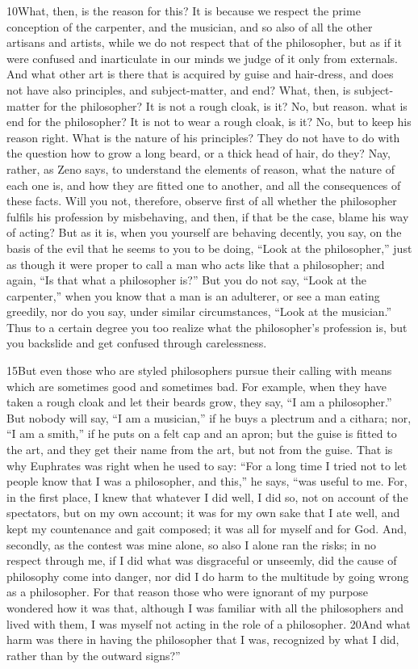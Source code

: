 10What, then, is the reason for this? It is because we respect the prime conception of the carpenter, and the musician, and so also of all the other artisans and artists, while we do not respect that of the philosopher, but as if it were confused and inarticulate in our minds we judge of it only from externals. And what other art is there that is acquired by guise and hair-dress, and does not have also principles, and subject-matter, and end? What, then, is subject-matter for the philosopher? It is not a rough cloak, is it? No, but reason. what is end for the philosopher? It is not to wear a rough cloak, is it? No, but to keep his reason right. What is the nature of his principles? They do not have to do with the question how to grow a long beard, or a thick head of hair, do they? Nay, rather, as Zeno says, to understand the elements of reason, what the nature of each one is, and how they are fitted one to another, and all the consequences of these facts. Will you not, therefore, observe first of all whether the philosopher fulfils his profession by misbehaving, and then, if that be the case, blame his way of acting? But as it is, when you yourself are behaving decently, you say, on the basis of the evil that he seems to you to be doing, ``Look at the philosopher,'' just as though it were proper to call a man who acts like that a philosopher; and again, ``Is that what a philosopher is?'' But you do not say, ``Look at the carpenter,'' when you know that a man is an adulterer, or see a man eating greedily, nor do you say, under similar circumstances, ``Look at the musician.'' Thus to a certain degree you too realize what the philosopher's profession is, but you backslide and get confused through carelessness.

15But even those who are styled philosophers pursue their calling with means which are sometimes good and sometimes bad. For example, when they have taken a rough cloak and let their beards grow, they say, ``I am a philosopher.'' But nobody will say, ``I am a musician,'' if he buys a plectrum and a cithara; nor, ``I am a smith,'' if he puts on a felt cap and an apron; but the guise is fitted to the art, and they get their name from the art, but not from the guise. That is why Euphrates was right when he used to say: ``For a long time I tried not to let people know that I was a philosopher, and this,'' he says, ``was useful to me. For, in the first place, I knew that whatever I did well, I did so, not on account of the spectators, but on my own account; it was for my own sake that I ate well, and kept my countenance and gait composed; it was all for myself and for God. And, secondly, as the contest was mine alone, so also I alone ran the risks; in no respect through me, if I did what was disgraceful or unseemly, did the cause of philosophy come into danger, nor did I do harm to the multitude by going wrong as a philosopher. For that reason those who were ignorant of my purpose wondered how it was that, although I was familiar with all the philosophers and lived with them, I was myself not acting in the role of a philosopher. 20And what harm was there in having the philosopher that I was, recognized by what I did, rather than by the outward signs?''

